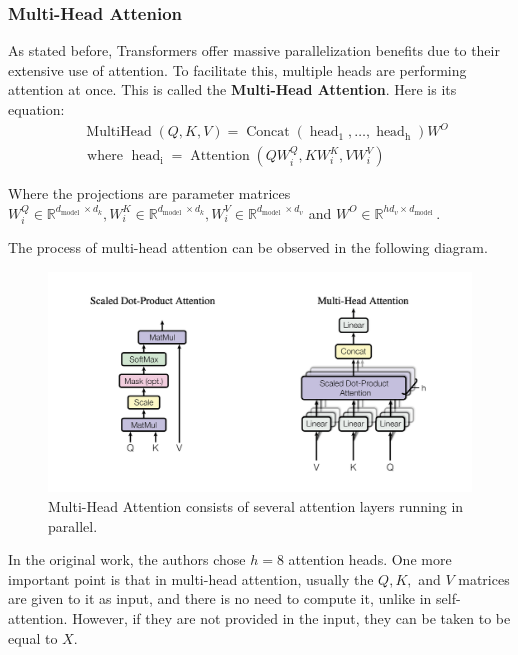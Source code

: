 \documentclass[11pt,twoside]{article}
\begin{document}
\subsubsection{Multi-Head Attenion}
As stated before, Transformers offer massive parallelization benefits due to their extensive use of attention. To facilitate this, multiple heads are performing attention at once. This is called the \textbf{Multi-Head Attention}. Here is its equation:
$$
\begin{aligned}
& \operatorname{MultiHead}(Q, K, V)=\operatorname{Concat}\left(\operatorname{head}_1, \ldots, \operatorname{ head}_{\mathrm{h}}\right) W^O \\
& \text { where } \operatorname { head}_{\mathrm{i}}=\operatorname{Attention}\left(Q W_i^Q, K W_i^K, V W_i^V\right)
\end{aligned}
$$


Where the projections are parameter matrices $W_i^Q \in \mathbb{R}^{d_{\text {model }} \times d_k}, W_i^K \in \mathbb{R}^{d_{\text {model }} \times d_k}, W_i^V \in \mathbb{R}^{d_{\text {model }} \times d_v}$ and $W^O \in \mathbb{R}^{h d_v \times d_{\text {model }}}$.

The process of multi-head attention can be observed in the following diagram.

\begin{figure}[h]
    \centering
    \includegraphics[width=0.9\linewidth]{fig/multi-head.png}
    \caption{Multi-Head Attention consists of several
attention layers running in parallel.}
    \label{fig:enter-label}
\end{figure}

In the original work, the authors chose $h=8$ attention heads. One more important point is that in multi-head attention, usually the $Q, K,$ and $V$ matrices are given to it as input, and there is no need to compute it, unlike in self-attention. However, if they are not provided in the input, they can be taken to be equal to $X$.
\end{document}
